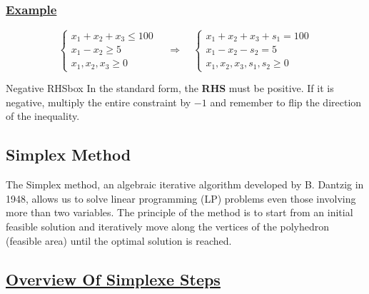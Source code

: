 \subsubsection*{\underline{Example}}

\[
\left\{
\begin{array}{l}
    x_{1} + x_{2} + x_{3} \leq 100 \\
    x_{1} - x_{2} \geq 5 \\
    x_{1}, x_{2}, x_{3} \geq 0
\end{array}
\right.
\quad
\Longrightarrow
\quad
\left\{
\begin{array}{l}
    x_{1} + x_{2} + x_{3} + s_{1} = 100 \\
    x_{1} - x_{2} - s_{2} = 5 \\
    x_{1}, x_{2}, x_{3}, s_{1}, s_{2} \geq 0
\end{array}
\right.
\]

\vspace{0.35cm}

\begin{prettyBox}{Negative RHS}{box}
In the standard form, the \textbf{RHS} must be positive. If it is negative, multiply the entire constraint by \(-1\) and remember to flip the direction of the inequality.
\end{prettyBox}

\vspace{1cm}
\subsection{Simplex Method}
The Simplex method, an algebraic iterative algorithm developed by B. Dantzig
in 1948, allows us to solve linear programming (LP) problems even those involving more 
than two variables. The principle of the method is to start from an initial feasible 
solution and iteratively move along the vertices of the polyhedron (feasible area) until the optimal solution
is reached.

\subsection*{\underline{Overview Of Simplexe Steps}}

